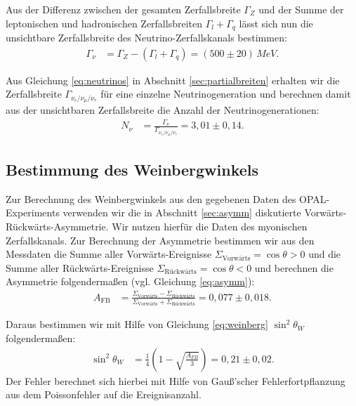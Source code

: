Aus der Differenz zwischen der gesamten Zerfallsbreite $\Gamma_Z$ und der Summe der leptonischen und hadronischen Zerfallsbreiten $\Gamma_l+\Gamma_q$ lässt sich nun die unsichtbare Zerfallsbreite des Neutrino-Zerfallskanals bestimmen:
\begin{align}
	\Gamma_\nu&=\Gamma_Z-\left(\Gamma_l+\Gamma_q\right)=(500\pm20)\,\si{MeV}\text{.}
\end{align}

Aus Gleichung \ref{eq:neutrinos} in Abschnitt \ref{sec:partialbreiten} erhalten wir die Zerfallsbreite $\Gamma_{\nu_e/\nu_\mu/\nu_\tau}$ für eine einzelne Neutrinogeneration und berechnen damit aus der unsichtbaren Zerfallsbreite die Anzahl der Neutrinogenerationen:
\begin{align}
	N_\nu&=\frac{\Gamma_\nu}{\Gamma_{\nu_e/\nu_\mu/\nu_\tau}}=3,01\pm0,14\text{.}
\end{align}

\subsection{Bestimmung des Weinbergwinkels}

Zur Berechnung des Weinbergwinkels aus den gegebenen Daten des OPAL-Experiments verwenden wir die in Abschnitt \ref{sec:asymm} diskutierte Vorwärts-Rückwärts-Asymmetrie. Wir nutzen hierfür die Daten des myonischen Zerfallskanals. Zur Berechnung der Asymmetrie bestimmen wir aus den Messdaten die Summe aller Vorwärts-Ereignisse $\Sigma_\text{Vorwärts}=\cos\theta>0$ und die Summe aller Rückwärts-Ereignisse $\Sigma_\text{Rückwärts}=\cos\theta<0$ und berechnen die Asymmetrie folgendermaßen (vgl. Gleichung \ref{eq:asymm}):
\begin{align}
	A_\text{FB}&=\frac{\Sigma_\text{Vorwärts}-\Sigma_\text{Rückwärts}}{\Sigma_\text{Vorwärts}+\Sigma_\text{Rückwärts}}=0,077\pm0,018\text{.}
\end{align}

Daraus bestimmen wir mit Hilfe von Gleichung \ref{eq:weinberg} $\sin^2\theta_W$ folgendermaßen:
\begin{align}
	\sin^2\theta_W&=\frac14\left(1-\sqrt{\frac{A_{FB}}3}\right)=0,21\pm0,02\text{.}
\end{align}
Der Fehler berechnet sich hierbei mit Hilfe von Gauß'scher Fehlerfortpflanzung aus dem Poissonfehler auf die Ereignisanzahl.